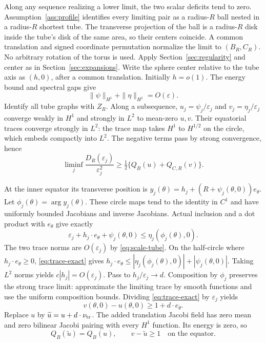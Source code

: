 \documentclass[11pt,reqno]{amsart}
\numberwithin{equation}{section}
\theoremstyle{definition}
\theoremstyle{remark}
\newcommand{\eps}{\varepsilon}
\begin{document}
Along any sequence realizing a lower limit, the two scalar deficits
tend to zero. Assumption~\ref{ass:profile} identifies every limiting
pair as a radius-$R$ ball nested in a radius-$R$ shortest tube. The
transverse projection of the ball is a radius-$R$ disk inside the
tube's disk of the same area, so their centers coincide. A common
translation and signed coordinate permutation normalize the limit to
$(B_R,C_R)$. No arbitrary rotation of the torus is used.
Apply Section~\ref{sec:regularity} and center as in
Section~\ref{sec:expansions}. Write the sphere center relative to the
tube axis as $(h,0)$, after a common translation. Initially $h=o(1)$.
The energy bound and spectral gaps give
\begin{equation}\label{eq:scale-tube}
 \|\psi\|_{H^1}+\|\eta\|_{H^1}=O(\eps).
\end{equation}
Identify all tube graphs with $Z_R$. Along a subsequence,
$u_j=\psi_j/\eps_j$ and $v_j=\eta_j/\eps_j$ converge weakly in $H^1$
and strongly in $L^2$ to mean-zero $u,v$. Their equatorial traces
converge strongly in $L^2$: the trace map takes $H^1$ to $H^{1/2}$
on the circle, which embeds compactly into $L^2$.
The negative terms pass by strong convergence, hence
\begin{equation}\label{eq:weak-energy}
 \liminf_j\frac{D_R(\eps_j)}{\eps_j^2}
 \ge\tfrac12\{Q_B(u)+Q_{C,R}(v)\}.
\end{equation}

At the inner equator its transverse position is
$y_j(\theta)=h_j+(R+\psi_j(\theta,0))e_\theta$.
Let $\phi_j(\theta)=\arg y_j(\theta)$.
These circle maps tend to the identity in $C^1$ and have uniformly
bounded Jacobians and inverse Jacobians. Actual inclusion and a dot
product with $e_\theta$ give exactly
\begin{equation}\label{eq:trace-exact}
 \eps_j+h_j\cdot e_\theta+\psi_j(\theta,0)
 \le\eta_j(\phi_j(\theta),0).
\end{equation}
The two trace norms are $O(\eps_j)$ by \eqref{eq:scale-tube}.
On the half-circle where $h_j\cdot e_\theta\ge0$,
\eqref{eq:trace-exact} gives
$h_j\cdot e_\theta\le|\eta_j(\phi_j(\theta),0)|+|\psi_j(\theta,0)|$.
Taking $L^2$ norms yields $c|h_j|=O(\eps_j)$. Pass to $h_j/\eps_j\to d$.
Composition by $\phi_j$ preserves the strong trace limit: approximate
the limiting trace by smooth functions and use the uniform composition
bounds. Dividing \eqref{eq:trace-exact} by $\eps_j$ yields
\[
 v(\theta,0)-u(\theta,0)\ge1+d\cdot e_\theta.
\]
Replace $u$ by $\widetilde u=u+d\cdot\nu_{\rm tr}$.
The added translation Jacobi field has zero mean and zero bilinear
Jacobi pairing with every $H^1$ function. Its energy is zero, so
\[
 Q_B(\widetilde u)=Q_B(u),\qquad v-\widetilde u\ge1
 \quad\text{on the equator}.
\]
\end{document}

